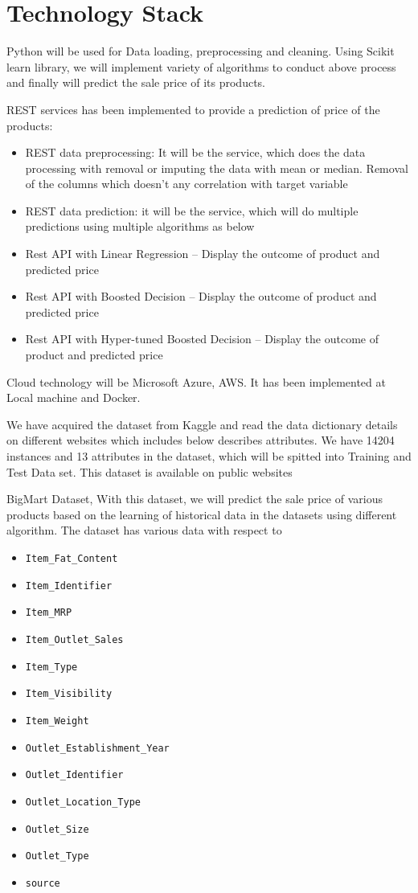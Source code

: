 \section{Technology Stack}

Python will be used for Data loading, preprocessing and cleaning. Using 
Scikit learn library, we will implement variety of algorithms to conduct 
above process and finally will predict the sale price of its products.

REST services has been implemented to provide a prediction of price of the 
products:

\begin{itemize}
	\item REST data preprocessing: It will be the service, which does 
the data processing 
	with removal or imputing the data with mean or median. Removal of 
the columns which doesn’t any correlation with target variable
	\item REST data prediction: it will be the service, which will 
do multiple predictions using multiple algorithms as below
	
	\item Rest API with Linear Regression – Display the outcome 
of product and predicted price
	\item Rest API with Boosted Decision – Display the outcome of 
product and predicted price
	\item Rest API with Hyper-tuned Boosted Decision – Display the 
outcome of product and predicted price
\end{itemize}

Cloud technology will be Microsoft Azure, AWS. It has been implemented at 
Local machine and Docker.

We have acquired the dataset from Kaggle and read the data dictionary details 
on different websites which includes below describes attributes. We have 14204 
instances and 13 attributes in the dataset, which will be spitted into 
Training and Test Data set. This dataset is available on public websites

BigMart Dataset, With this dataset, we will predict the sale price of 
various products based on the learning of historical data in the datasets 
using different algorithm. The dataset has various data with respect to
\begin{itemize}
\item \verb|Item_Fat_Content|
\item \verb|Item_Identifier|
\item \verb|Item_MRP|
\item \verb|Item_Outlet_Sales|
\item \verb|Item_Type|
\item \verb|Item_Visibility|
\item \verb|Item_Weight|
\item \verb|Outlet_Establishment_Year|
\item \verb|Outlet_Identifier|
\item \verb|Outlet_Location_Type|
\item \verb|Outlet_Size|
\item \verb|Outlet_Type|
\item \verb|source|
\end{itemize}
~\cite{kaggleds}

